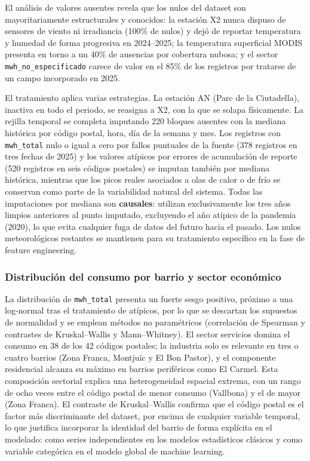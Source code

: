 \documentclass[12pt, a4paper]{article}
\begin{document}
El análisis de valores ausentes revela que los nulos del dataset son mayoritariamente estructurales y conocidos: la estación X2 nunca dispuso de sensores de viento ni irradiancia (100\% de nulos) y dejó de reportar temperatura y humedad de forma progresiva en 2024--2025; la temperatura superficial MODIS presenta en torno a un 40\% de ausencias por cobertura nubosa; y el sector \texttt{mwh\_no\_especificado} carece de valor en el 85\% de los registros por tratarse de un campo incorporado en 2025.

El tratamiento aplica varias estrategias. La estación AN (Parc de la Ciutadella), inactiva en todo el periodo, se reasigna a X2, con la que se solapa físicamente. La rejilla temporal se completa imputando 220 bloques ausentes con la mediana histórica por código postal, hora, día de la semana y mes. Los registros con \texttt{mwh\_total} nulo o igual a cero por fallos puntuales de la fuente (378 registros en tres fechas de 2025) y los valores atípicos por errores de acumulación de reporte (520 registros en seis códigos postales) se imputan también por mediana histórica, mientras que los picos reales asociados a olas de calor o de frío se conservan como parte de la variabilidad natural del sistema. Todas las imputaciones por mediana son \textbf{causales}: utilizan exclusivamente los tres años limpios anteriores al punto imputado, excluyendo el año atípico de la pandemia (2020), lo que evita cualquier fuga de datos del futuro hacia el pasado. Los nulos meteorológicos restantes se mantienen para su tratamiento específico en la fase de feature engineering.

\subsubsection{Distribución del consumo por barrio y sector económico}


La distribución de \texttt{mwh\_total} presenta un fuerte sesgo positivo, próximo a una log-normal tras el tratamiento de atípicos, por lo que se descartan los supuestos de normalidad y se emplean métodos no paramétricos (correlación de Spearman y contrastes de Kruskal--Wallis y Mann--Whitney). El sector servicios domina el consumo en 38 de los 42 códigos postales; la industria solo es relevante en tres o cuatro barrios (Zona Franca, Montjuïc y El Bon Pastor), y el componente residencial alcanza su máximo en barrios periféricos como El Carmel. Esta composición sectorial explica una heterogeneidad espacial extrema, con un rango de ocho veces entre el código postal de menor consumo (Vallbona) y el de mayor (Zona Franca). El contraste de Kruskal--Wallis confirma que el código postal es el factor más discriminante del dataset, por encima de cualquier variable temporal, lo que justifica incorporar la identidad del barrio de forma explícita en el modelado: como series independientes en los modelos estadísticos clásicos y como variable categórica en el modelo global de machine learning.
\end{document}
